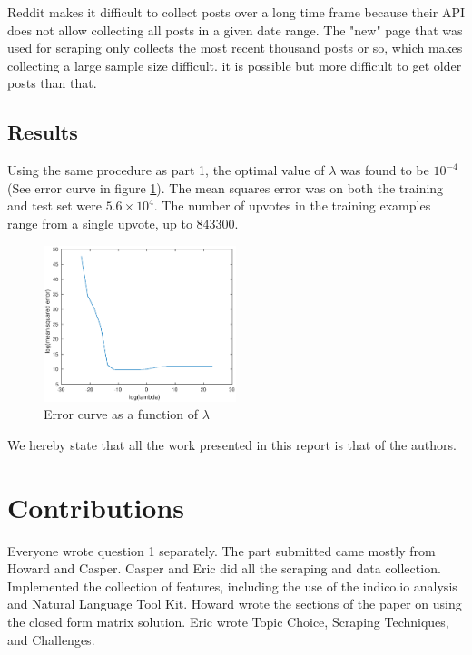 \documentclass[10pt,twocolumn]{article}
\begin{document}
Reddit makes it difficult to collect posts over a long time frame because their API does not allow collecting all posts in a given date range. The "new" page that was used for scraping only collects the most recent thousand posts or so, which makes collecting a large sample size difficult. it is possible but more difficult to get older posts than that.

\subsection{Results}

Using the same procedure as part 1, the optimal value of $\lambda$ was found to be $10^{-4}$ (See error curve in figure \ref{fig:ecurve2-lambda}).
The mean squares error was on both the training and test set were $5.6\times 10^{4}$.
The number of upvotes in the training examples range from a single upvote, up to $843300$.

\begin{figure}[htpb]
	\centering
	\includegraphics[width=0.5\textwidth]{part2-error-curve}
	\caption{Error curve as a function of $\lambda$}
	\label{fig:ecurve2-lambda}
\end{figure}

We hereby state that all the work presented in this report is that of the authors.

\section{Contributions}

	Everyone wrote question 1 separately. The part submitted came mostly from Howard and Casper.
	Casper and Eric did all the scraping and data collection. Implemented the collection of features, including the use of the indico.io analysis and Natural Language Tool Kit.
	Howard wrote the sections of the paper on using the closed form matrix solution. Eric wrote Topic Choice, Scraping Techniques, and Challenges.
\end{document}

